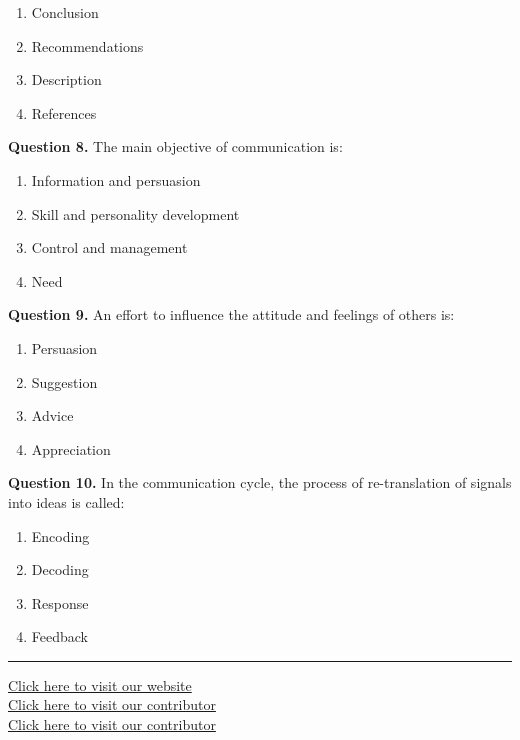 \documentclass[11pt,a4paper]{article}
\begin{document}
\begin{enumerate}[label=(\alph*),itemsep=2pt]
  \item Conclusion
  \item Recommendations
  \item Description
  \item References
\end{enumerate}

\medskip


\noindent   \textbf{Question 8.} The main objective of communication is:

\begin{enumerate}[label=(\alph*),itemsep=2pt]
  \item Information and persuasion
  \item Skill and personality development
  \item Control and management
  \item Need
\end{enumerate}

\medskip


\noindent   \textbf{Question 9.} An effort to influence the attitude and feelings of others is:

\begin{enumerate}[label=(\alph*),itemsep=2pt]
  \item Persuasion
  \item Suggestion
  \item Advice
  \item Appreciation
\end{enumerate}

\medskip


\noindent   \textbf{Question 10.} In the communication cycle, the process of re-translation of signals into ideas is called:

\begin{enumerate}[label=(\alph*),itemsep=2pt]
  \item Encoding
  \item Decoding
  \item Response
  \item Feedback
\end{enumerate}

\vfill
\rule{\linewidth}{0.4pt}

\begin{center}\small
\href{https://bhu-exam.vercel.app/}{Click here to visit our website}\\[4pt]\href{https://me-aryan.vercel.app/}{Click here to visit our contributor}\\[4pt]\href{https://quashan-me.vercel.app/}{Click here to visit our contributor}
\end{center}
\end{document}
